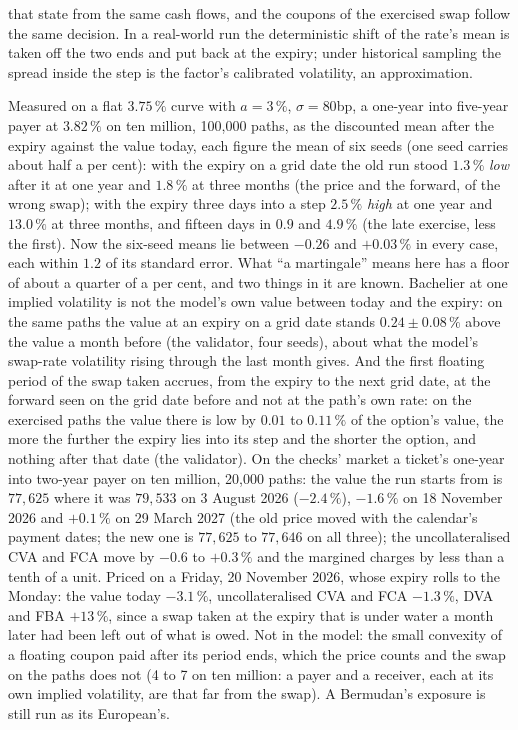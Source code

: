 \documentclass[11pt,a4paper]{article}
\begin{document}
that state from the same cash flows, and the coupons of the exercised swap follow the same decision. In a real-world run the deterministic shift of the rate's mean is taken off the two ends and put back at the expiry; under historical sampling the spread inside the step is the factor's calibrated volatility, an approximation.

Measured on a flat $3.75\,\%$ curve with $a=3\,\%$, $\sigma=80$bp, a one-year into five-year payer at $3.82\,\%$ on ten million, 100,000 paths, as the discounted mean after the expiry against the value today, each figure the mean of six seeds (one seed carries about half a per cent): with the expiry on a grid date the old run stood $1.3\,\%$ \emph{low} after it at one year and $1.8\,\%$ at three months (the price and the forward, of the wrong swap); with the expiry three days into a step $2.5\,\%$ \emph{high} at one year and $13.0\,\%$ at three months, and fifteen days in $0.9$ and $4.9\,\%$ (the late exercise, less the first). Now the six-seed means lie between $-0.26$ and $+0.03\,\%$ in every case, each within $1.2$ of its standard error. What ``a martingale'' means here has a floor of about a quarter of a per cent, and two things in it are known. Bachelier at one implied volatility is not the model's own value between today and the expiry: on the same paths the value at an expiry on a grid date stands $0.24\pm0.08\,\%$ above the value a month before (the validator, four seeds), about what the model's swap-rate volatility rising through the last month gives. And the first floating period of the swap taken accrues, from the expiry to the next grid date, at the forward seen on the grid date before and not at the path's own rate: on the exercised paths the value there is low by $0.01$ to $0.11\,\%$ of the option's value, the more the further the expiry lies into its step and the shorter the option, and nothing after that date (the validator). On the checks' market a ticket's one-year into two-year payer on ten million, 20,000 paths: the value the run starts from is $77{,}625$ where it was $79{,}533$ on 3 August 2026 ($-2.4\,\%$), $-1.6\,\%$ on 18 November 2026 and $+0.1\,\%$ on 29 March 2027 (the old price moved with the calendar's payment dates; the new one is $77{,}625$ to $77{,}646$ on all three); the uncollateralised CVA and FCA move by $-0.6$ to $+0.3\,\%$ and the margined charges by less than a tenth of a unit. Priced on a Friday, 20 November 2026, whose expiry rolls to the Monday: the value today $-3.1\,\%$, uncollateralised CVA and FCA $-1.3\,\%$, DVA and FBA $+13\,\%$, since a swap taken at the expiry that is under water a month later had been left out of what is owed. Not in the model: the small convexity of a floating coupon paid after its period ends, which the price counts and the swap on the paths does not (4 to 7 on ten million: a payer and a receiver, each at its own implied volatility, are that far from the swap). A Bermudan's exposure is still run as its European's.
\end{document}
